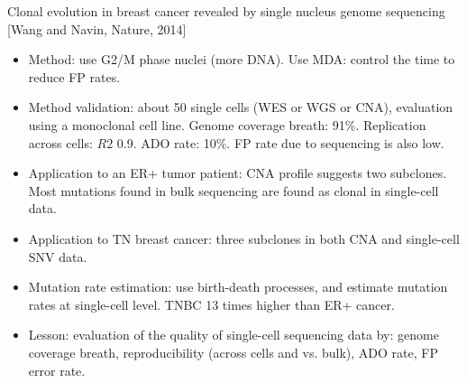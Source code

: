 \documentclass{report}
\begin{document}
Clonal evolution in breast cancer revealed by single nucleus genome sequencing [Wang and Navin, Nature, 2014]
\begin{itemize}
	
	\item Method: use G2/M phase nuclei (more DNA). Use MDA: control the time to reduce FP rates.  
	
	\item Method validation: about 50 single cells (WES or WGS or CNA), evaluation using a monoclonal cell line. Genome coverage breath: 91\%. Replication across cells: $R2$ 0.9. ADO rate: 10\%. FP rate due to sequencing is also low. 
	
	\item Application to an ER+ tumor patient: CNA profile suggests two subclones. Most mutations found in bulk sequencing are found as clonal in single-cell data.  
	
	\item Application to TN breast cancer: three subclones in both CNA and single-cell SNV data. 
	
	\item Mutation rate estimation: use birth-death processes, and estimate mutation rates at single-cell level. TNBC 13 times higher than ER+ cancer. 
	
	\item Lesson: evaluation of the quality of single-cell sequencing data by: genome coverage breath, reproducibility (across cells and vs. bulk), ADO rate, FP error rate.
\end{itemize}
\end{document}
